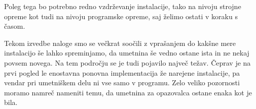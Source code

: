 Poleg tega bo potrebno redno vzdrževanje instalacije, tako na
nivoju strojne opreme kot tudi na nivoju programske opreme, saj želimo ostati
v koraku s časom.

Tekom izvedbe naloge smo se večkrat soočili z vprašanjem do kakšne mere
instalacijo še lahko spreminjamo, da umetnina še vedno ostane ista in ne nekaj
povsem novega. Na tem področju se je tudi pojavilo največ težav. Čeprav je na
prvi pogled le enostavna ponovna implementacija že narejene instalacije, pa
vendar pri umetniškem delu ni vse samo v programu. Zelo veliko pozornosti
moramo namreč nameniti temu, da umetnina za opazovalca ostane enaka kot je
bila.
